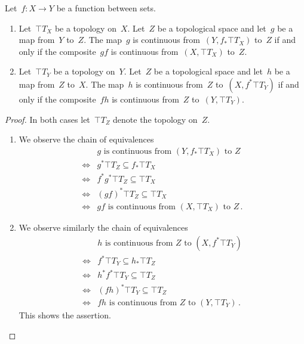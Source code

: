 \begin{corollary}
	\label{universal properties for pullback and pushforward of topologies}
	Let~$f \colon X \to Y$ be a function between sets.
	\begin{enumerate}

		\item
			Let~$\top{T}_X$ be a topology on~$X$.
			Let~$Z$ be a topological space and let~$g$ be a map from~$Y$ to~$Z$.
			The map~$g$ is continuous from~$(Y, f_* \top{T}_X)$ to~$Z$ if and only if the composite~$g f$ is continuous from~$(X, \top{T}_X)$ to~$Z$.

		\item
			Let~$\top{T}_Y$ be a topology on~$Y$.
			Let~$Z$ be a topological space and let~$h$ be a map from~$Z$ to~$X$.
			The map~$h$ is continuous from~$Z$ to~$(X, f^* \top{T}_Y)$ if and only if the composite~$f h$ is continuous from~$Z$ to~$(Y, \top{T}_Y)$.

	\end{enumerate}
\end{corollary}

\begin{proof}
	In both cases let~$\top{T}_Z$ denote the topology on~$Z$.
	\begin{enumerate}

		\item
			We observe the chain of equivalences
			\begin{align*}
				{}&
				\text{$g$ is continuous from~$(Y, f_* \top{T}_X)$ to~$Z$} \\
				\iff{}&
				g^* \top{T}_Z ⊆ f_* \top{T}_X \\
				\iff{}&
				f^* g^* \top{T}_Z ⊆ \top{T}_X \\
				\iff{}&
				(g f)^* \top{T}_Z ⊆ \top{T}_X \\
				\iff{}&
				\text{$g f$ is continuous from~$(X, \top{T}_X)$ to~$Z$} \,.
			\end{align*}

		\item
			We observe similarly the chain of equivalences
			\begin{align*}
				{}&
				\text{$h$ is continuous from~$Z$ to~$(X, f^* \top{T}_Y)$} \\
				\iff{}&
				f^* \top{T}_Y ⊆ h_* \top{T}_Z \\
				\iff{}&
				h^* f^* \top{T}_Y ⊆ \top{T}_Z \\
				\iff{}&
				(f h)^* \top{T}_Y ⊆ \top{T}_Z \\
				\iff{}&
				\text{$f h$ is continuous from~$Z$ to~$(Y, \top{T}_Y)$} \,.
			\end{align*}
			This shows the assertion.
		\qedhere

	\end{enumerate}
\end{proof}
